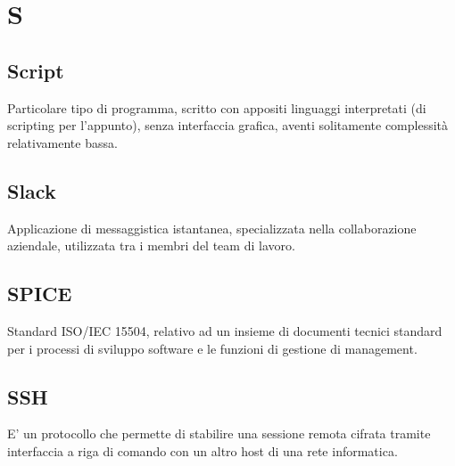 \section*{S}

\subsection{Script}
Particolare tipo di programma, scritto con appositi linguaggi interpretati (di scripting per l'appunto), senza interfaccia grafica, aventi solitamente complessità relativamente bassa.

\subsection{Slack}
Applicazione di messaggistica istantanea, specializzata nella collaborazione aziendale, utilizzata tra i membri del team di lavoro.

\subsection{SPICE}
Standard ISO/IEC 15504, relativo ad un insieme di documenti tecnici standard per i processi di sviluppo software e le funzioni di gestione di management.

\subsection{SSH}
E' un protocollo che permette di stabilire una sessione remota cifrata tramite interfaccia a riga di comando con un altro host di una rete informatica.